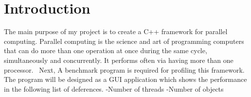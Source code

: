 \hypertarget{index_Introduction}{}\section{Introduction}\label{index_Introduction}
The main purpose of my project is to create a C++ framework for parallel computing. Parallel computing is the science and art of programming computers that can do more than one operation at once during the same cycle, simultaneously and concurrently. It performs often via having more than one processor.~\newline
 Next, A benchmark program is required for profiling this framework. The program will be designed as a G\+U\+I application which shows the performance in the following list of deferences. -\/\+Number of threads -\/\+Number of objects 